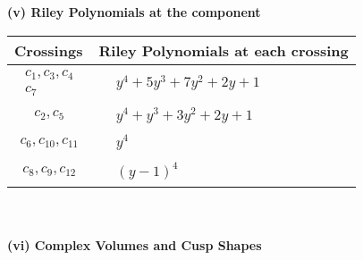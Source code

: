\documentclass[1p]{elsarticle_modified}
\theoremstyle{definition}
\begin{document}
\newpage\renewcommand{\arraystretch}{1}
\flushleft \textbf{(v) Riley Polynomials at the component}\newline \\
\begin{tabular}{m{50pt}|m{274pt}}
Crossings & \hspace{64pt}Riley Polynomials at each crossing \\
\hline $$\begin{aligned}c_{1},c_{3},c_{4}\\c_{7}\end{aligned}$$&$\begin{aligned}
&y^4+5 y^3+7 y^2+2 y+1
\end{aligned}$\\
\hline $$\begin{aligned}c_{2},c_{5}\end{aligned}$$&$\begin{aligned}
&y^4+y^3+3 y^2+2 y+1
\end{aligned}$\\
\hline $$\begin{aligned}c_{6},c_{10},c_{11}\end{aligned}$$&$\begin{aligned}
&y^4
\end{aligned}$\\
\hline $$\begin{aligned}c_{8},c_{9},c_{12}\end{aligned}$$&$\begin{aligned}
&(y-1)^4
\end{aligned}$\\
\hline
\end{tabular}\\~\\
\newpage\flushleft \textbf{(vi) Complex Volumes and Cusp Shapes}
\end{document}
